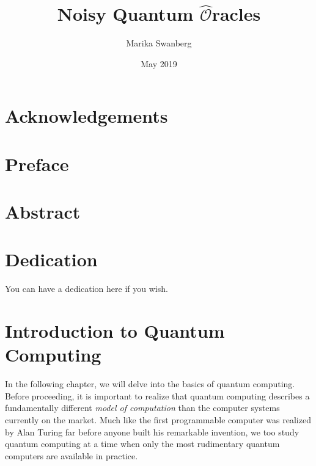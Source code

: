 \documentclass[12pt,twoside]{reedthesis}
\title{Noisy Quantum $\widehat{\mathcal{O}}$racles}
\author{Marika Swanberg}
\date{May 2019}
\theoremstyle{definition}
\begin{document}
  \maketitle
  \frontmatter %
  \pagestyle{empty} %

    \chapter*{Acknowledgements}

   \chapter*{Preface}

 

    \tableofcontents

    \chapter*{Abstract}
	
	\chapter*{Dedication}
	You can have a dedication here if you wish.

  \mainmatter %
  \pagestyle{fancyplain} %


	
\chapter{Introduction to Quantum Computing}


In the following chapter, we will delve into the basics of quantum computing. Before proceeding, it is important to realize that quantum computing describes a  fundamentally different \textit{model of computation} than the computer systems currently on the market. Much like the first programmable computer was realized by Alan Turing far before anyone built his remarkable invention, we too study quantum computing at a time when only the most rudimentary quantum computers are available in practice.
\end{document}
